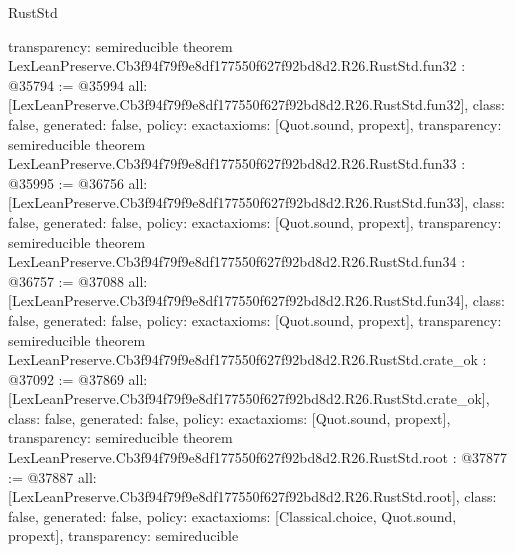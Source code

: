 \begin{lexlean}{RustStd}
\begin{coremodule}
{  transparency: semireducible
}
theorem LexLeanPreserve.Cb3f94f79f9e8df177550f627f92bd8d2.R26.RustStd.fun32 : @35794 := @35994 {
  all: [LexLeanPreserve.Cb3f94f79f9e8df177550f627f92bd8d2.R26.RustStd.fun32],
  class: false,
  generated: false,
  policy: exact{axioms: [Quot.sound, propext]},
  transparency: semireducible
}
theorem LexLeanPreserve.Cb3f94f79f9e8df177550f627f92bd8d2.R26.RustStd.fun33 : @35995 := @36756 {
  all: [LexLeanPreserve.Cb3f94f79f9e8df177550f627f92bd8d2.R26.RustStd.fun33],
  class: false,
  generated: false,
  policy: exact{axioms: [Quot.sound, propext]},
  transparency: semireducible
}
theorem LexLeanPreserve.Cb3f94f79f9e8df177550f627f92bd8d2.R26.RustStd.fun34 : @36757 := @37088 {
  all: [LexLeanPreserve.Cb3f94f79f9e8df177550f627f92bd8d2.R26.RustStd.fun34],
  class: false,
  generated: false,
  policy: exact{axioms: [Quot.sound, propext]},
  transparency: semireducible
}
theorem LexLeanPreserve.Cb3f94f79f9e8df177550f627f92bd8d2.R26.RustStd.crate_ok : @37092 := @37869 {
  all: [LexLeanPreserve.Cb3f94f79f9e8df177550f627f92bd8d2.R26.RustStd.crate_ok],
  class: false,
  generated: false,
  policy: exact{axioms: [Quot.sound, propext]},
  transparency: semireducible
}
theorem LexLeanPreserve.Cb3f94f79f9e8df177550f627f92bd8d2.R26.RustStd.root : @37877 := @37887 {
  all: [LexLeanPreserve.Cb3f94f79f9e8df177550f627f92bd8d2.R26.RustStd.root],
  class: false,
  generated: false,
  policy: exact{axioms: [Classical.choice, Quot.sound, propext]},
  transparency: semireducible
}


\end{coremodule}
\end{lexlean}
